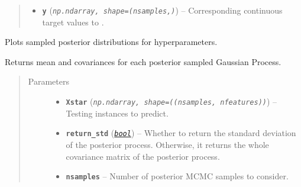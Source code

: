 \documentclass[letterpaper,10pt,english]{sphinxmanual}
\begin{document}
\begin{fulllineitems}
\begin{fulllineitems}
\begin{quote}
\begin{description}
\begin{itemize}
\item {} 
\textbf{\texttt{y}} (\emph{\texttt{np.ndarray, shape=(nsamples,)}}) -- Corresponding continuous target values to .

\end{itemize}

\end{description}\end{quote}

\end{fulllineitems}


\begin{fulllineitems}
\label{pyGPGO.surrogates.GaussianProcessMCMC:pyGPGO.surrogates.GaussianProcessMCMC.GaussianProcessMCMC.posteriorPlot}
Plots sampled posterior distributions for hyperparameters.

\end{fulllineitems}


\begin{fulllineitems}
\label{pyGPGO.surrogates.GaussianProcessMCMC:pyGPGO.surrogates.GaussianProcessMCMC.GaussianProcessMCMC.predict}
Returns mean and covariances for each posterior sampled Gaussian Process.
\begin{quote}\begin{description}
\item[{Parameters}] \leavevmode\begin{itemize}
\item {} 
\textbf{\texttt{Xstar}} (\emph{\texttt{np.ndarray, shape=((nsamples, nfeatures))}}) -- Testing instances to predict.

\item {} 
\textbf{\texttt{return\_std}} (\href{https://docs.python.org/2/library/functions.html\#bool}{\emph{\texttt{bool}}}) -- Whether to return the standard deviation of the posterior process. Otherwise,
it returns the whole covariance matrix of the posterior process.

\item {} 
\textbf{\texttt{nsamples}} -- Number of posterior MCMC samples to consider.


\end{itemize}
\end{description}
\end{quote}
\end{fulllineitems}
\end{fulllineitems}
\end{document}
